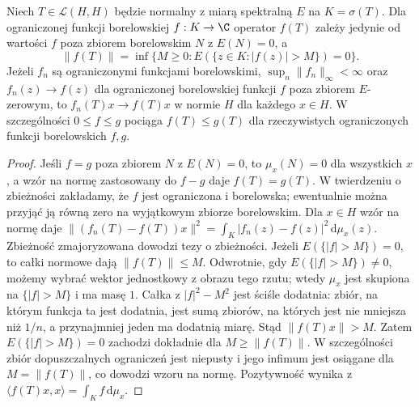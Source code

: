 \begin{twierdzenie}
\label{thm:borel-convergence32}
Niech $T\in\mathcal L(H,H)$ będzie normalny z miarą spektralną $E$
na $K=\sigma(T)$. Dla ograniczonej funkcji borelowskiej
$f:K\to\C$ operator $f(T)$ zależy jedynie od wartości $f$
poza zbiorem borelowskim $N$ z $E(N)=0$, a
\[
 \|f(T)\|=\inf\{M\ge0:E(\{z\in K:|f(z)|>M\})=0\}.
\]
Jeżeli $f_n$ są ograniczonymi funkcjami borelowskimi,
$\sup_n\|f_n\|_\infty<\infty$ oraz $f_n(z)\to f(z)$
dla ograniczonej borelowskiej funkcji $f$ poza zbiorem
$E$-zerowym, to $f_n(T)x\to f(T)x$
w normie $H$ dla każdego $x\in H$.
W szczególności $0\le f\le g$ pociąga $f(T)\le g(T)$
dla rzeczywistych ograniczonych funkcji borelowskich $f,g$.
\end{twierdzenie}
\begin{proof}
Jeśli $f=g$ poza zbiorem $N$ z $E(N)=0$, to
$\mu_x(N)=0$ dla wszystkich $x$, a wzór na normę
zastosowany do $f-g$ daje $f(T)=g(T)$.
W twierdzeniu o zbieżności zakładamy, że $f$ jest
ograniczona i borelowska; ewentualnie można przyjąć
ją równą zero na wyjątkowym zbiorze borelowskim.
Dla $x\in H$ wzór na normę daje
$\|(f_n(T)-f(T))x\|^2
=\int_K|f_n(z)-f(z)|^2\,\mathrm d\mu_x(z)$.
Zbieżność zmajoryzowana dowodzi tezy o zbieżności.
Jeżeli $E(\{|f|>M\})=0$, to całki normowe dają
$\|f(T)\|\le M$. Odwrotnie, gdy $E(\{|f|>M\})\ne0$,
możemy wybrać wektor jednostkowy z obrazu tego rzutu;
wtedy $\mu_x$ jest skupiona na $\{|f|>M\}$ i ma masę
$1$. Całka z $|f|^2-M^2$ jest ściśle dodatnia:
zbiór, na którym funkcja ta jest dodatnia, jest sumą
zbiorów, na których jest nie mniejsza niż $1/n$,
a przynajmniej jeden ma dodatnią miarę. Stąd
$\|f(T)x\|>M$. Zatem $E(\{|f|>M\})=0$ zachodzi dokładnie dla
$M\geq\|f(T)\|$. W szczególności zbiór dopuszczalnych
ograniczeń jest niepusty i jego infimum jest osiągane dla
$M=\|f(T)\|$, co dowodzi wzoru na normę.
Pozytywność wynika z
$\langle f(T)x,x\rangle=\int_Kf\,\mathrm d\mu_x$.
\end{proof}

